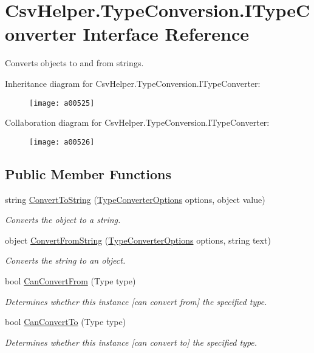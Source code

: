 \hypertarget{a00117}{\section{Csv\-Helper.\-Type\-Conversion.\-I\-Type\-Converter Interface Reference}
\label{a00117}
}


Converts objects to and from strings.  




Inheritance diagram for Csv\-Helper.\-Type\-Conversion.\-I\-Type\-Converter\-:
\nopagebreak
\begin{figure}[H]
\begin{center}
\leavevmode
\texttt{[image: a00525]}
\end{center}
\end{figure}


Collaboration diagram for Csv\-Helper.\-Type\-Conversion.\-I\-Type\-Converter\-:
\nopagebreak
\begin{figure}[H]
\begin{center}
\leavevmode
\texttt{[image: a00526]}
\end{center}
\end{figure}
\subsection*{Public Member Functions}
\begin{DoxyCompactItemize}
\item 
string \hyperlink{a00117_a90c465c63dbcf913f38aa878f35e77c7}{Convert\-To\-String} (\hyperlink{a00156}{Type\-Converter\-Options} options, object value)
\begin{DoxyCompactList}\small\item\em Converts the object to a string. \end{DoxyCompactList}\item 
object \hyperlink{a00117_ab598e04c22e5a7890b6d21011492283e}{Convert\-From\-String} (\hyperlink{a00156}{Type\-Converter\-Options} options, string text)
\begin{DoxyCompactList}\small\item\em Converts the string to an object. \end{DoxyCompactList}\item 
bool \hyperlink{a00117_ae1ad863656f4fa96bd846a41344c9349}{Can\-Convert\-From} (Type type)
\begin{DoxyCompactList}\small\item\em Determines whether this instance \mbox{[}can convert from\mbox{]} the specified type. \end{DoxyCompactList}\item 
bool \hyperlink{a00117_a168b03dad37fcb6882101c93deac8111}{Can\-Convert\-To} (Type type)
\begin{DoxyCompactList}\small\item\em Determines whether this instance \mbox{[}can convert to\mbox{]} the specified type. \end{DoxyCompactList}\end{DoxyCompactItemize}


